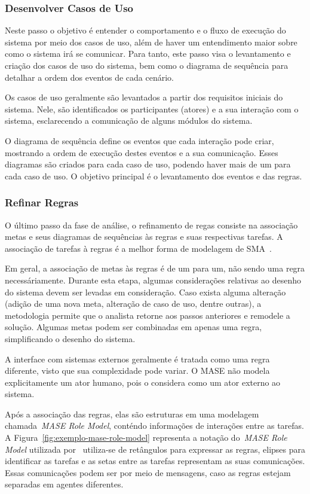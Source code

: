 \subsubsection{Desenvolver Casos de Uso}

Neste passo o objetivo é entender o comportamento e o fluxo de execução do sistema por meio dos casos de uso, além de haver um entendimento maior sobre como o sistema irá se comunicar. Para tanto, este passo visa o levantamento e criação dos casos de uso do sistema, bem como o diagrama de sequência para detalhar a ordem dos eventos de cada cenário.

Os casos de uso geralmente são levantados a partir dos requisitos iniciais do sistema. Nele, são identificados os participantes (atores) e a sua interação com o sistema, esclarecendo a comunicação de alguns módulos do sistema.

O diagrama de sequência define os eventos que cada interação pode criar, mostrando a ordem de execução destes eventos e a sua comunicação. Esses diagramas são criados para cada caso de uso, podendo haver mais de um para cada caso de uso. O objetivo principal é o levantamento dos eventos e das regras.

\subsubsection{Refinar Regras}

O último passo da fase de análise, o refinamento de regas consiste na associação metas e seus diagramas de sequências às regras e suas respectivas tarefas. A associação de tarefas à regras é a melhor forma de modelagem de SMA~\cite{scott01}. 

Em geral, a associação de metas às regras é de um para um, não sendo uma regra necessáriamente. Durante esta etapa, algumas considerações relativas ao desenho do sistema devem ser levadas em consideração. Caso exista alguma alteração (adição de uma nova meta, alteração de caso de uso, dentre outras), a metodologia permite que o analista retorne aos passos anteriores e remodele a solução. Algumas metas podem ser combinadas em apenas uma regra, simplificando o desenho do sistema.

A interface com sistemas externos geralmente é tratada como uma regra diferente, visto que sua complexidade pode variar. O MASE não modela explicitamente um ator humano, pois o considera como um ator externo ao sistema.

Após a associação das regras, elas são estruturas em uma modelagem chamada~\emph{MASE Role Model}, conténdo informações de interações entre as tarefas. A Figura~\ref{fig:exemplo-mase-role-model} representa a notação do~\emph{MASE Role Model} utilizada por~\cite{scott01} utiliza-se de retângulos para expressar as regras, elipses para identificar as tarefas e as setas entre as tarefas representam as suas comunicações. Essas comunicações podem ser por meio de mensagens, caso as regras estejam separadas em agentes diferentes.

